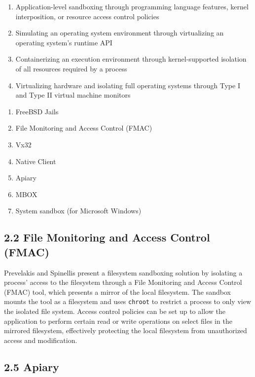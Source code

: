 \documentclass{proc}
\begin{document}
\begin{enumerate}
    \item Application-level sandboxing through programming language features, kernel interposition, or resource access control policies
    \item Simulating an operating system environment through virtualizing an operating system's runtime API
    \item Containerizing an execution environment through kernel-supported isolation of all resources required by a process
    \item Virtualizing hardware and isolating full operating systems through Type I and Type II virtual machine monitors
\end{enumerate}
\begin{enumerate}
    \item FreeBSD Jails \cite{kamp2000jails}
    \item File Monitoring and Access Control (FMAC) \cite{prevelakis2001fmac}
    \item Vx32 \cite{ford2008vx32}
    \item Native Client \cite{yee2009native}
    \item Apiary \cite{potter2010apiary}
    \item MBOX \cite{kim2013mbox}
    \item System sandbox (for Microsoft Windows) \cite{vokorokos2015sandboxMSWIN}
\end{enumerate}


\subsection*{2.2 File Monitoring and Access Control (FMAC)}

Prevelakis and Spinellis \cite{prevelakis2001fmac} present a filesystem sandboxing solution by isolating a process' access to the filesystem through a File Monitoring and Access Control (FMAC) tool, which presents a mirror of the local filesystem. The sandbox mounts the tool as a filesystem and uses \texttt{chroot} to restrict a process to only view the isolated file system. Access control policies can be set up to allow the application to perform certain read or write operations on select files in the mirrored filesystem, effectively protecting the local filesystem from unauthorized access and modification.

\subsection*{2.5 Apiary}
\end{document}

